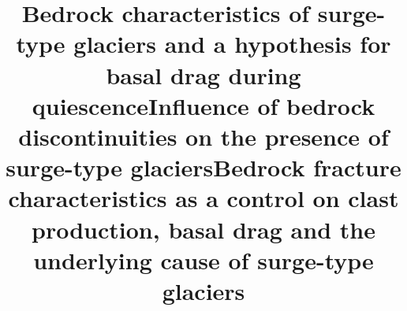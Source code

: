\documentclass[draft,linenumbers]{agujournal}
\begin{document}
% 
%


\title{Bedrock characteristics of surge-type glaciers and a hypothesis for basal drag during quiescence}
\title{Influence of bedrock discontinuities on the presence of surge-type glaciers}
\title{Bedrock fracture characteristics as a control on clast production, basal drag and the underlying cause of surge-type glaciers}



%
%









\end{document}
